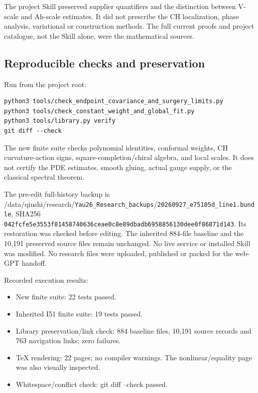 \documentclass[
  10pt,
]{article}
\providecommand{\tightlist}{%
  \setlength{\itemsep}{0pt}\setlength{\parskip}{0pt}}
\begin{document}
The project Skill preserved supplier quantifiers and the distinction
between V-scale and Ah-scale estimates. It did not prescribe the CH
localization, phase analysis, variational or construction methods. The
full current proofs and project catalogue, not the Skill alone, were the
mathematical sources.

\hypertarget{reproducible-checks-and-preservation}{%
\subsection{Reproducible checks and
preservation}\label{reproducible-checks-and-preservation}}

Run from the project root:

\begin{verbatim}
python3 tools/check_endpoint_covariance_and_surgery_limits.py
python3 tools/check_constant_weight_and_global_fit.py
python3 tools/library.py verify
git diff --check
\end{verbatim}

The new finite suite checks polynomial identities, conformal weights, CH
curvature-action signs, square-completion/chiral algebra, and local
scales. It does not certify the PDE estimates, smooth gluing, actual
gauge supply, or the classical spectral theorem.

The pre-edit full-history backup is
/data/qiushi/research/\nolinkurl{Yau26_Research_backups}/\nolinkurl{20260927_e75105d_line1.bundle},
SHA256 \nolinkurl{042fcfe5e3553f81458740636ceae0c8e89dbadb6958856130dee0f86871d143}.
Its restoration was checked before editing. The inherited 884-file
baseline and the 10,191 preserved source files remain unchanged. No live
service or installed Skill was modified. No research files were
uploaded, published or packed for the web-GPT handoff.

Recorded execution results:

\begin{itemize}
\tightlist
\item
  New finite suite: 22 tests passed.
\item
  Inherited I51 finite suite: 19 tests passed.
\item
  Library preservation/link check: 884 baseline files, 10,191 source
  records and 763 navigation links; zero failures.
\item
  TeX rendering: 22 pages; no compiler warnings. The nonlinear/equality
  page was also visually inspected.
\item
  Whitespace/conflict check: git diff --check passed.
\end{itemize}
\end{document}
